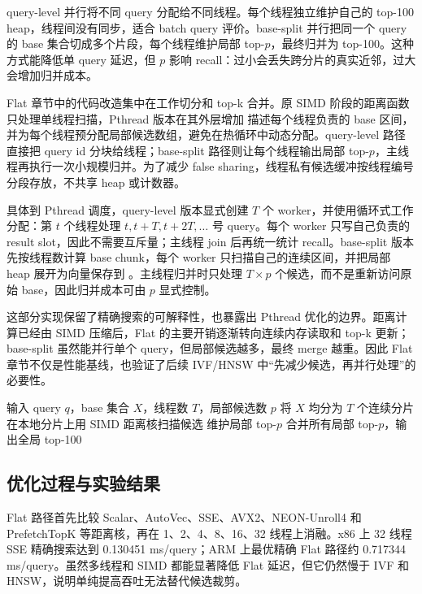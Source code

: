 \documentclass[11pt,a4paper]{article}
\newcommand{\code}[1]{\texttt{\detokenize{#1}}}
\begin{document}
query-level 并行将不同 query 分配给不同线程。每个线程独立维护自己的 top-100 heap，线程间没有同步，适合 batch query 评价。base-split 并行把同一个 query 的 base 集合切成多个片段，每个线程维护局部 top-$p$，最终归并为 top-100。这种方式能降低单 query 延迟，但 $p$ 影响 recall：过小会丢失跨分片的真实近邻，过大会增加归并成本。

Flat 章节中的代码改造集中在工作切分和 top-k 合并。原 SIMD 阶段的距离函数只处理单线程扫描，Pthread 版本在其外层增加 \code{ThreadRange} 描述每个线程负责的 base 区间，并为每个线程预分配局部候选数组，避免在热循环中动态分配。query-level 路径直接把 query id 分块给线程；base-split 路径则让每个线程输出局部 top-$p$，主线程再执行一次小规模归并。为了减少 false sharing，线程私有候选缓冲按线程编号分段存放，不共享 heap 或计数器。

具体到 Pthread 调度，query-level 版本显式创建 $T$ 个 worker，并使用循环式工作分配：第 $t$ 个线程处理 $t,t+T,t+2T,\ldots$ 号 query。每个 worker 只写自己负责的 result slot，因此不需要互斥量；主线程 join 后再统一统计 recall。base-split 版本先按线程数计算 base chunk，每个 worker 只扫描自己的连续区间，并把局部 heap 展开为向量保存到 \code{local\_results[t][qi]}。主线程归并时只处理 $T\times p$ 个候选，而不是重新访问原始 base，因此归并成本可由 $p$ 显式控制。

这部分实现保留了精确搜索的可解释性，也暴露出 Pthread 优化的边界。距离计算已经由 SIMD 压缩后，Flat 的主要开销逐渐转向连续内存读取和 top-k 更新；base-split 虽然能并行单个 query，但局部候选越多，最终 merge 越重。因此 Flat 章节不仅是性能基线，也验证了后续 IVF/HNSW 中“先减少候选，再并行处理”的必要性。

\begin{algorithm}[H]
\caption{Flat base-split 并行搜索}
\label{alg:flat_split}
\begin{algorithmic}[1]
\State 输入 query $q$，base 集合 $X$，线程数 $T$，局部候选数 $p$
\State 将 $X$ 均分为 $T$ 个连续分片
  \State 在本地分片上用 SIMD 距离核扫描候选
  \State 维护局部 top-$p$
\EndFor
\State 合并所有局部 top-$p$，输出全局 top-100
\end{algorithmic}
\end{algorithm}

\subsection{优化过程与实验结果}

Flat 路径首先比较 Scalar、AutoVec、SSE、AVX2、NEON-Unroll4 和 PrefetchTopK 等距离核，再在 1、2、4、8、16、32 线程上消融。x86 上 32 线程 SSE 精确搜索达到 0.130451 ms/query；ARM 上最优精确 Flat 路径约 0.717344 ms/query。虽然多线程和 SIMD 都能显著降低 Flat 延迟，但它仍然慢于 IVF 和 HNSW，说明单纯提高吞吐无法替代候选裁剪。
\end{document}
